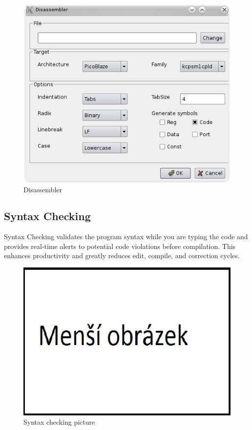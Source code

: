     \begin{figure}
        \centering{}
        \includegraphics [scale=1]{img/disassembler_window.png}
        \caption{Disassembler}
    \end{figure}

\subsection{Syntax Checking}
    Syntax Checking validates the program syntax while you are typing
    the code and provides real-time alerts to potential code violations
    before compilation. This enhances productivity and greatly reduces
    edit, compile, and correction cycles.
    \begin{figure}
        \centering{}
        \includegraphics [scale=0.3]{img/mensi_obrazek.png}
        \caption{Syntax checking picture}
    \end{figure}

